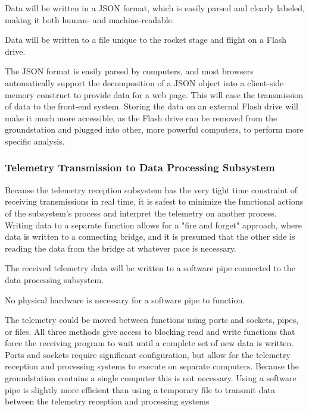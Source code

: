 \documentclass[onecolumn, draftclsnofoot,10pt, compsoc]{IEEEtran}
\begin{document}
Data will be written in a JSON format, which is easily parsed and clearly labeled, making it both human- and machine-readable.

Data will be written to a file unique to the rocket stage and flight on a Flash drive.

The JSON format is easily parsed by computers, and most browsers automatically support the decomposition of a JSON object into a client-side memory construct to provide data for a web page.
This will ease the transmission of data to the front-end system.
Storing the data on an external Flash drive will make it much more accessible, as the Flash drive can be removed from the groundstation and plugged into other, more powerful computers, to perform more specific analysis.


\subsubsection{Telemetry Transmission to Data Processing Subsystem}
Because the telemetry reception subsystem has the very tight time constraint of receiving transmissions in real time, it is safest to minimize the functional actions of the subsystem's process and interpret the telemetry on another process.
Writing data to a separate function allows for a "fire and forget" approach, where data is written to a connecting bridge, and it is presumed that the other side is reading the data from the bridge at whatever pace is necessary.

The received telemetry data will be written to a software pipe connected to the data processing subsystem.

No physical hardware is necessary for a software pipe to function.

The telemetry could be moved between functions using ports and sockets, pipes, or files.
All three methods give access to blocking read and write functions that force the receiving program to wait until a complete set of new data is written.
Ports and sockets require significant configuration, but allow for the telemetry reception and processing systems to execute on separate computers.
Because the groundstation contains a single computer this is not necessary.
Using a software pipe is slightly more efficient than using a temporary file to transmit data between the telemetry reception and processing systems
\end{document}
